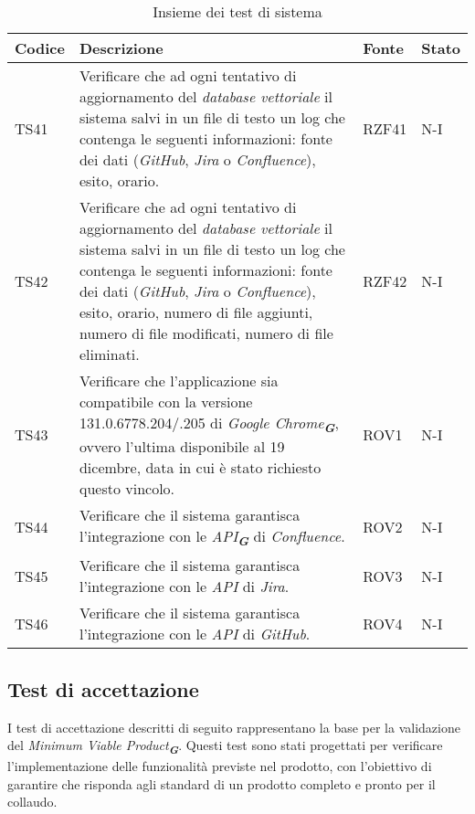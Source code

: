\begin{table}[h!]
\begin{tabularx}{\textwidth}{|p{}|X|p{}|p{}|}
    \end{tabularx}
\end{table}

\newpage

\begin{table}[h!]
    \centering
    \renewcommand{\arraystretch}{1.5}
    \begin{tabularx}{\textwidth}{|p{}|X|p{}|p{}|}\hline
    \rowcolor[HTML]{FFD700}
    \textbf{Codice} & \textbf{Descrizione} & \textbf{Fonte} & \textbf{Stato} \\ \hline
 
    TS41 & Verificare che ad ogni tentativo di aggiornamento del \emph{database vettoriale} il sistema salvi in un file di testo un log che contenga le seguenti informazioni: fonte dei dati (\emph{GitHub}, \emph{Jira} o \emph{Confluence}), esito, orario. & RZF41 & N-I \\ \hline
    TS42 & Verificare che ad ogni tentativo di aggiornamento del \emph{database vettoriale} il sistema salvi in un file di testo un log che contenga le seguenti informazioni: fonte dei dati (\emph{GitHub}, \emph{Jira} o \emph{Confluence}), esito, orario, numero di file aggiunti, numero di file modificati, numero di file eliminati. & RZF42 & N-I \\ \hline
    TS43 & Verificare che l'applicazione sia compatibile con la versione  131.0.6778.204/.205 di \emph{Google Chrome}\textsubscript{\textit{\textbf{G}}}, ovvero l’ultima disponibile al 19 dicembre, data in cui è stato richiesto questo vincolo. & ROV1 & N-I \\ \hline
    TS44 & Verificare che il sistema garantisca l'integrazione con le \emph{API}\textsubscript{\textit{\textbf{G}}} di \emph{Confluence}. & ROV2 & N-I \\ \hline
    TS45 & Verificare che il sistema garantisca l'integrazione con le \emph{API} di \emph{Jira}. & ROV3 & N-I \\ \hline
    TS46 & Verificare che il sistema garantisca l'integrazione con le \emph{API} di \emph{GitHub}. & ROV4 & N-I \\ \hline

    \end{tabularx}
    \caption{Insieme dei test di sistema}
\end{table}

\newpage

\subsection{Test di accettazione}
\label{sec:Test di accettazione}
I test di accettazione descritti di seguito rappresentano la base per la validazione del \emph{Minimum Viable Product}\textsubscript{\textit{\textbf{G}}}. Questi test sono stati progettati per verificare l’implementazione delle funzionalità previste nel prodotto, con l’obiettivo di garantire che risponda agli standard di un prodotto completo e pronto per il collaudo.

